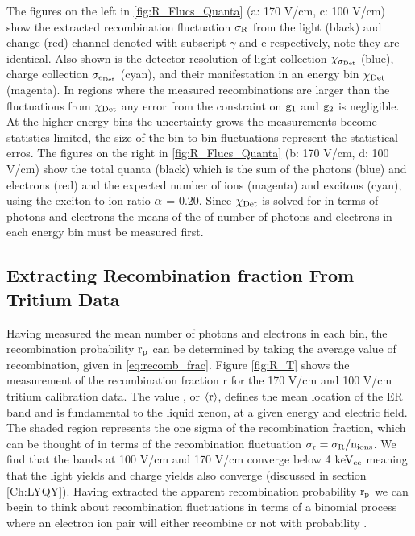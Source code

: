 The figures on the left in \ref{fig:R_Flucs_Quanta} (a: 170 V/cm, c: 100 V/cm) show the extracted recombination fluctuation $\rm \sigma_R$ from the light (black) and change (red) channel denoted with subscript $\gamma$ and e respectively, note they are identical. Also shown is the detector resolution of light collection $\rm \chi_{\sigma_{Det}}$ (blue), charge collection $\rm \sigma_{e_{Det}}$ (cyan), and their manifestation in an energy bin $\rm \chi_{Det}$ (magenta). In regions where the measured recombinations are larger than the fluctuations from $\rm \chi_{Det}$ any error from the constraint on $\rm g_1$ and $\rm g_2$ is negligible. At the higher energy bins the uncertainty grows the measurements become statistics limited, the size of the bin to bin fluctuations represent the statistical erros. The figures on the right in \ref{fig:R_Flucs_Quanta} (b: 170 V/cm, d: 100 V/cm) show the total quanta (black) which is the sum of the photons (blue) and electrons (red) and the expected number of ions (magenta) and excitons (cyan), using the exciton-to-ion ratio $\rm \alpha$ = 0.20. Since $\rm \chi_{Det}$ is solved for in terms of photons and electrons the means of the of number of photons and electrons in each energy bin must be measured first.

\newpage

\subsection{Extracting Recombination fraction From Tritium Data}

Having measured the mean number of photons and electrons in each bin, the recombination probability $\rm r_p$ can be determined by taking the average value of recombination, given in \ref{eq:recomb_frac}. Figure \ref{fig:R_T} shows the measurement of the recombination fraction r for the 170 V/cm and 100 V/cm tritium calibration data. The value \rp, or $\rm \left<r\right>$, defines the mean location of the ER band and is fundamental to the liquid xenon, at a given energy and electric field. The shaded region represents the one sigma of the recombination fraction, which can be thought of in terms of the recombination fluctuation $\rm \sigma_r = \sigma_R / n_{ions} $. We find that the bands at 100 V/cm and 170 V/cm converge below 4 $\rm keV_{ee}$ meaning that the light yields and charge yields also converge (discussed in section \ref{Ch:LYQY}). Having extracted the apparent recombination probability $\rm r_p$ we can begin to think about recombination fluctuations in terms of a binomial process where an electron ion pair will either recombine or not with probability \rp.

